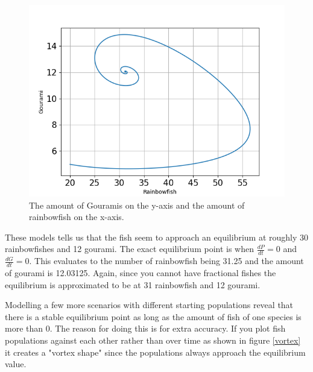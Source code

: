\begin{figure}[H]
    \includegraphics[scale=0.4]{../figures/Figure_3.png}
    \centering
    \caption{The amount of Gouramis on the y-axis and the amount of
        rainbowfish on the x-axis.}
\end{figure}

\begin{flushleft}
    These models tells us that the fish seem to approach an equilibrium at roughly
    30 rainbowfishes and 12 gourami. The exact equilibrium point is when $\frac{dP}{dt}=0$ and $\frac{dG}{dt}=0$.
    This evaluates to the number of rainbowfish being 31.25 and the amount of gourami is 12.03125. Again, since you
    cannot have fractional fishes the equilibrium is approximated to be at 31 rainbowfish and 12 gourami.

\end{flushleft}

\begin{flushleft}
    Modelling a few more scenarios with different
    starting populations reveal that there is a stable equilibrium point
    as long as the amount of fish of one species is more than 0. The reason
    for doing this is for extra accuracy.
    If you plot fish populations against each other rather than over
    time as shown in figure \ref{vortex} it creates a "vortex shape"
    since the populations always approach the equilibrium value.
\end{flushleft}

